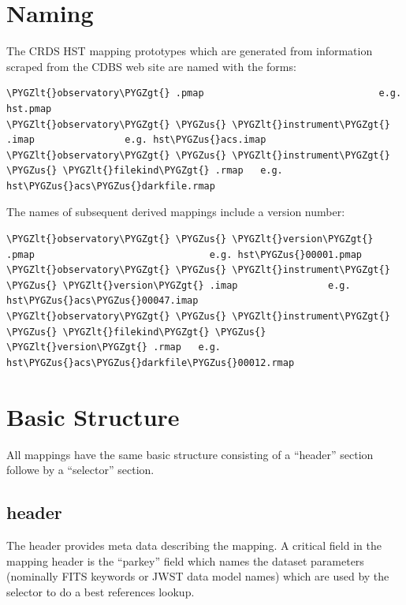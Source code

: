 \documentclass[letterpaper,10pt,english]{sphinxmanual}
\def\PYGZus{\char`\_}
\def\PYGZlt{\char`\<}
\def\PYGZgt{\char`\>}
\begin{document}
\section{Naming}
\label{rmap_syntax:naming}
The CRDS HST mapping prototypes which are generated from information scraped from
the CDBS web site are named with the forms:

\begin{Verbatim}[commandchars=\\\{\}]
\PYGZlt{}observatory\PYGZgt{} .pmap                               e.g. hst.pmap
\PYGZlt{}observatory\PYGZgt{} \PYGZus{} \PYGZlt{}instrument\PYGZgt{} .imap                e.g. hst\PYGZus{}acs.imap
\PYGZlt{}observatory\PYGZgt{} \PYGZus{} \PYGZlt{}instrument\PYGZgt{} \PYGZus{} \PYGZlt{}filekind\PYGZgt{} .rmap   e.g. hst\PYGZus{}acs\PYGZus{}darkfile.rmap
\end{Verbatim}

The names of subsequent derived mappings include a version number:

\begin{Verbatim}[commandchars=\\\{\}]
\PYGZlt{}observatory\PYGZgt{} \PYGZus{} \PYGZlt{}version\PYGZgt{} .pmap                               e.g. hst\PYGZus{}00001.pmap
\PYGZlt{}observatory\PYGZgt{} \PYGZus{} \PYGZlt{}instrument\PYGZgt{} \PYGZus{} \PYGZlt{}version\PYGZgt{} .imap                e.g. hst\PYGZus{}acs\PYGZus{}00047.imap
\PYGZlt{}observatory\PYGZgt{} \PYGZus{} \PYGZlt{}instrument\PYGZgt{} \PYGZus{} \PYGZlt{}filekind\PYGZgt{} \PYGZus{} \PYGZlt{}version\PYGZgt{} .rmap   e.g. hst\PYGZus{}acs\PYGZus{}darkfile\PYGZus{}00012.rmap
\end{Verbatim}


\section{Basic Structure}
\label{rmap_syntax:basic-structure}
All mappings have the same basic structure consisting of a ``header'' section followe by a ``selector'' section.


\subsection{header}
\label{rmap_syntax:header}
The header provides meta data describing the mapping.  A critical field in the mapping header is the ``parkey''
field which names the dataset parameters (nominally FITS keywords or JWST data model names) which are used by
the selector to do a best references lookup.
\end{document}
